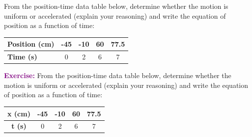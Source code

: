 \begin{exercise}
    From the position-time data table below, determine whether the motion is uniform or accelerated (explain your reasoning) and write the equation of position as a function of time:
    \begin{table}[H]
        \centering
        \renewcommand{\arraystretch}{1.5}
        \begin{tabular}{Occcc}
            \bottomrule
            \textcolor{ocre}{\textbf{Position (\unit{\centi\metre})}} & -45 & -10 & 60 & 77.5 \\
            \hline
            \textcolor{ocre}{\textbf{Time (\unit{\s})}}               & 0   & 2   & 6  & 7    \\
            \toprule
        \end{tabular}
        \label{tab:ejercicio3}
    \end{table}
%

    \begin{solu}
        \textbf{\textcolor{purple}{Exercise:}} From the position-time data table below, determine whether the motion is uniform or accelerated (explain your reasoning) and write the equation of position as a function of time:
        \begin{center}
            \begin{tabular}{@{}ccccc@{}}
                \toprule
                \textbf{x (cm)} & \textbf{-45} & \textbf{-10} & \textbf{60} & \textbf{77.5} \\
                \midrule
                \textbf{t (s)} & 0 & 2 & 6 & 7 \\
                \bottomrule
            \end{tabular}
        \end{center}


\end{solu}
\end{exercise}
